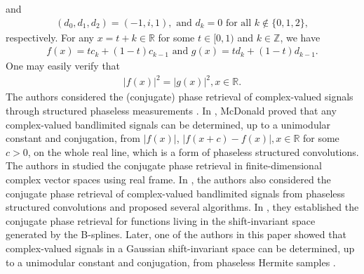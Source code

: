 \documentclass[12pt,oneside,reqno]{amsart}
\newcommand{\Z}{\mathbb{Z}}
\newcommand{\R}{\mathbb{R}}
\numberwithin{equation}{section}
\begin{document}
	and
	\begin{align*}
		(d_0,d_1,d_2)=(-1,i,1), \text{ and } d_k=0 \text{ for all } k\notin \{0,1,2\},  
	\end{align*}
	respectively. For any $x=t+k\in \R$   for some $t\in [0,1)$ and $k\in \Z$, we have
	\begin{align*}
		f(x)=tc_k+(1-t)c_{k-1} \text{ and } g(x)=td_k+(1-t)d_{k-1}.
	\end{align*}
	One may easily verify that
	\begin{align*}
		|f(x)|^2=|g(x)|^2, x\in \R.
	\end{align*}
	The authors considered the  (conjugate) phase retrieval of complex-valued  signals through structured phaseless measurements \cite{chen2024conjugate,chen2023conjugate, jaming2014uniqueness,lai2021conjugate,mc2004phase,pohl2014phaseless}. %
	In \cite{mc2004phase}, McDonald  proved that any complex-valued bandlimited signals can be determined, up to a unimodular constant and conjugation, from $|f(x)|$, $|f(x+c)-f(x)|, x\in \R$ for some $c>0$, on the whole real line,  which is a form of  phaseless structured convolutions.  The authors in \cite{evans2020conjugate} studied the conjugate phase retrieval  in finite-dimensional complex vector spaces using real frame. In \cite{lai2021conjugate}, the authors also considered the conjugate phase retrieval of complex-valued bandlimited signals from  phaseless structured convolutions and  proposed several algorithms. In  \cite{chen2023conjugate}, they established the  conjugate phase retrieval for functions living in the shift-invariant space generated by the  B-splines.   Later, one of the authors in this paper  showed that complex-valued signals in a Gaussian shift-invariant space can be determined, up to a unimodular   constant and conjugation, from phaseless Hermite samples \cite{chen2024conjugate}.  
	
\end{document}
